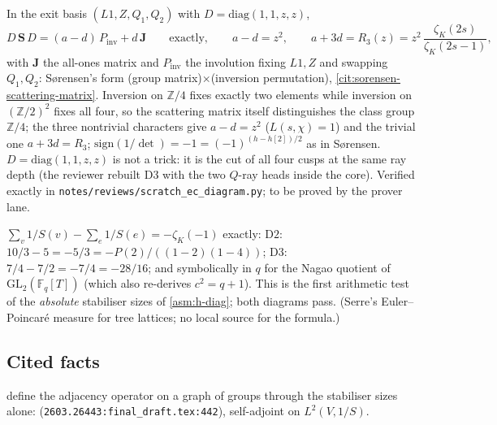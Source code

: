 \begin{proposition}
\label{prop:d3-group-matrix}
In the exit basis $(L1,Z,Q_1,Q_2)$ with $D = \mathrm{diag}(1,1,z,z)$,
\[
D\,\mathbf S\,D = (a-d)\,P_{\mathrm{inv}} + d\,\mathbf J\qquad\text{exactly},\qquad a-d = z^2,\qquad a+3d = R_3(z) = z^2\,\frac{\zeta_K(2s)}{\zeta_K(2s-1)},
\]
with $\mathbf J$ the all-ones matrix and $P_{\mathrm{inv}}$ the involution fixing $L1,Z$ and swapping $Q_1,Q_2$: Sørensen's
form (group matrix)$\times$(inversion permutation), \cref{cit:sorensen-scattering-matrix}. Inversion on $\mathbb Z/4$ fixes
exactly two elements while inversion on $(\mathbb Z/2)^2$ fixes all four, so the scattering matrix itself distinguishes
the class group $\mathbb Z/4$; the three nontrivial characters give $a-d = z^2$ ($L(s,\chi) = 1$) and the trivial one
$a+3d = R_3$; $\mathrm{sign}(1/\det) = -1 = (-1)^{(h-h[2])/2}$ as in Sørensen. $D = \mathrm{diag}(1,1,z,z)$ is not a trick: it is
the cut of all four cusps at the same ray depth (the reviewer rebuilt $\mathrm{D3}$ with the two $Q$-ray heads inside the
core). Verified exactly in \texttt{notes/reviews/scratch\_ec\_diagram.py}; to be proved by the prover lane.
\end{proposition}

\begin{proposition}
\label{prop:euler-poincare-mass}
$\sum_v1/S(v)-\sum_e1/S(e) = -\zeta_K(-1)$ exactly: $\mathrm{D2}$: $10/3-5 = -5/3 = -P(2)/((1-2)(1-4))$; $\mathrm{D3}$:
$7/4-7/2 = -7/4 = -28/16$; and symbolically in $q$ for the Nagao quotient of $\mathrm{GL}_2(\mathbb F_q[T])$ (which also
re-derives $c^2 = q+1$). This is the first arithmetic test of the \emph{absolute} stabiliser sizes of \cref{asm:h-diag};
both diagrams pass. (Serre's Euler--Poincaré measure for tree lattices; no local source for the formula.)
\end{proposition}

\subsection{Cited facts}

\begin{citedfact}
\label{cit:apw-adjacency}
\cite{arends2026resonances} define the adjacency operator on a graph of groups through the stabiliser
sizes alone: \texttt{}
(\texttt{2603.26443:final\_draft.tex:442}), self-adjoint on $L^2(V,1/S)$.
\end{citedfact}

